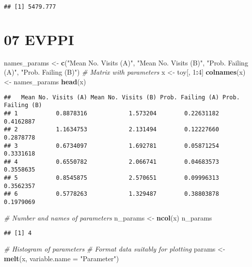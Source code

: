\documentclass[
]{article}
\newenvironment{Shaded}{\begin{snugshade}}{\end{snugshade}}
\newcommand{\CommentTok}[1]{\textcolor[rgb]{0.56,0.35,0.01}{\textit{#1}}}
\newcommand{\DataTypeTok}[1]{\textcolor[rgb]{0.13,0.29,0.53}{#1}}
\newcommand{\DecValTok}[1]{\textcolor[rgb]{0.00,0.00,0.81}{#1}}
\newcommand{\KeywordTok}[1]{\textcolor[rgb]{0.13,0.29,0.53}{\textbf{#1}}}
\newcommand{\NormalTok}[1]{#1}
\newcommand{\OperatorTok}[1]{\textcolor[rgb]{0.81,0.36,0.00}{\textbf{#1}}}
\newcommand{\StringTok}[1]{\textcolor[rgb]{0.31,0.60,0.02}{#1}}
\begin{document}
\begin{verbatim}
## [1] 5479.777
\end{verbatim}

\hypertarget{evppi}{%
\section{07 EVPPI}\label{evppi}}

\begin{Shaded}
\begin{Highlighting}[]
\NormalTok{names_params <-}\StringTok{ }\KeywordTok{c}\NormalTok{(}\StringTok{"Mean No. Visits (A)"}\NormalTok{, }
                   \StringTok{"Mean No. Visits (B)"}\NormalTok{,}
                   \StringTok{"Prob. Failing (A)"}\NormalTok{, }
                   \StringTok{"Prob. Failing (B)"}\NormalTok{)}
\CommentTok{# Matrix with parameters}
\NormalTok{x <-}\StringTok{ }\NormalTok{toy[, }\DecValTok{1}\OperatorTok{:}\DecValTok{4}\NormalTok{]}
\KeywordTok{colnames}\NormalTok{(x) <-}\StringTok{ }\NormalTok{names_params}
\KeywordTok{head}\NormalTok{(x)}
\end{Highlighting}
\end{Shaded}

\begin{verbatim}
##   Mean No. Visits (A) Mean No. Visits (B) Prob. Failing (A) Prob. Failing (B)
## 1           0.8878316            1.573204        0.22631182         0.4162887
## 2           1.1634753            2.131494        0.12227660         0.2878778
## 3           0.6734097            1.692781        0.05871254         0.3331618
## 4           0.6550782            2.066741        0.04683573         0.3558635
## 5           0.8545875            2.570651        0.09996313         0.3562357
## 6           0.5778263            1.329487        0.38803878         0.1979069
\end{verbatim}

\begin{Shaded}
\begin{Highlighting}[]
\CommentTok{# Number and names of parameters}
\NormalTok{n_params <-}\StringTok{ }\KeywordTok{ncol}\NormalTok{(x)}
\NormalTok{n_params}
\end{Highlighting}
\end{Shaded}

\begin{verbatim}
## [1] 4
\end{verbatim}

\begin{Shaded}
\begin{Highlighting}[]
\CommentTok{# Histogram of parameters}
\CommentTok{# Format data suitably for plotting}
\NormalTok{params <-}\StringTok{ }\KeywordTok{melt}\NormalTok{(x, }\DataTypeTok{variable.name =} \StringTok{"Parameter"}\NormalTok{)}
\end{Highlighting}
\end{Shaded}
\end{document}
